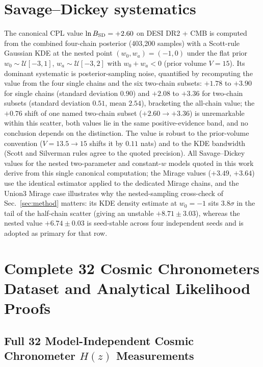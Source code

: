 \documentclass[aps,prd,preprint,superscriptaddress,nofootinbib]{revtex4-2}
\begin{document}
\appendix

\section{Savage--Dickey systematics}
\label{app:sd}

The canonical CPL value $\ln B_{\rm SD} = +2.60$ on DESI DR2 + CMB is computed from the combined four-chain posterior (403{,}200 samples) with a Scott-rule Gaussian KDE at the nested point $(w_0, w_a) = (-1, 0)$ under the flat prior $w_0 \sim \mathcal{U}[-3,1]$, $w_a \sim \mathcal{U}[-3,2]$ with $w_0 + w_a < 0$ (prior volume $V = 15$). Its dominant systematic is posterior-sampling noise, quantified by recomputing the value from the four single chains and the six two-chain subsets: $+1.78$ to $+3.90$ for single chains (standard deviation $0.90$) and $+2.08$ to $+3.36$ for two-chain subsets (standard deviation $0.51$, mean $2.54$), bracketing the all-chain value; the $+0.76$ shift of one named two-chain subset ($+2.60 \to +3.36$) is unremarkable within this scatter, both values lie in the same positive-evidence band, and no conclusion depends on the distinction. The value is robust to the prior-volume convention ($V = 13.5 \to 15$ shifts it by $0.11$ nats) and to the KDE bandwidth (Scott and Silverman rules agree to the quoted precision). All Savage--Dickey values for the nested two-parameter and constant-$w$ models quoted in this work derive from this single canonical computation; the Mirage values ($+3.49$, $+3.64$) use the identical estimator applied to the dedicated Mirage chains, and the Union3 Mirage case illustrates why the nested-sampling cross-check of Sec.~\ref{sec:method} matters: its KDE density estimate at $w_0 = -1$ sits $3.8\sigma$ in the tail of the half-chain scatter (giving an unstable $+8.71 \pm 3.03$), whereas the nested value $+6.74 \pm 0.03$ is seed-stable across four independent seeds and is adopted as primary for that row.



\section{Complete 32 Cosmic Chronometers Dataset and Analytical Likelihood Proofs}
\label{app:ccdata}

\subsection{Full 32 Model-Independent Cosmic Chronometer $H(z)$ Measurements}
\end{document}
